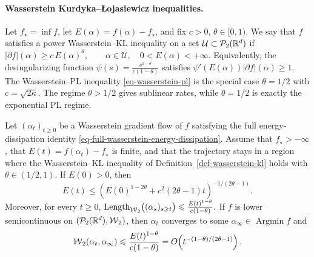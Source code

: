 \paragraph{Wasserstein Kurdyka--{\L}ojasiewicz inequalities.}
\begin{defn}\label{def-wasserstein-kl}
Let \(f_\star=\inf f\), let \(E(\alpha)=f(\alpha)-f_\star\), and fix \(c>0\), \(\theta\in[0,1)\). We say that \(f\) satisfies a power Wasserstein--KL inequality on a set \(\mathcal U\subset \mathcal{P}_2(\mathbb{R}^d)\) if
\(|\partial f|(\alpha) \geq c\,E(\alpha)^\theta, \qquad \alpha\in\mathcal U, \quad 0<E(\alpha)<+\infty.\)
Equivalently, the desingularizing function
\(\psi(s)=\frac{s^{1-\theta}}{c(1-\theta)}\)
satisfies \(\psi'(E(\alpha))|\partial f|(\alpha)\geq 1\). The Wasserstein--PL inequality \eqref{eq-wasserstein-pl} is the special case \(\theta=1/2\) with \(c=\sqrt{2\kappa}\). The regime \(\theta>1/2\) gives sublinear rates, while \(\theta=1/2\) is exactly the exponential PL regime.
\end{defn}
\begin{thm}\label{thm-wasserstein-kl-sublinear}
Let \((\alpha_t)_{t\geq0}\) be a Wasserstein gradient flow of \(f\) satisfying the full energy-dissipation identity \eqref{eq-full-wasserstein-energy-dissipation}. Assume that \(f_\star> -\infty\), that \(E(t)=f(\alpha_t)-f_\star\) is finite, and that the trajectory stays in a region where the Wasserstein--KL inequality of Definition~\ref{def-wasserstein-kl} holds with \(\theta\in(1/2,1)\). If \(E(0)>0\), then
\[
E(t)
\leq
\left(E(0)^{1-2\theta}+c^2(2\theta-1)t\right)^{-1/(2\theta-1)}.
\]
Moreover, for every \(t\geq0\), \(\operatorname{Length}_{\operatorname{\mathcal{W}}_2}\bigl((\alpha_s)_{s\geqslant t}\bigr) \leqslant \frac{E(t)^{1-\theta}}{c(1-\theta)}.\)
If \(f\) is lower semicontinuous on \((\mathcal{P}_2(\mathbb{R}^d),\operatorname{\mathcal{W}}_2)\), then \(\alpha_t\) converges to some \(\alpha_\infty\in\operatorname{Argmin}f\) and
\[
\operatorname{\mathcal{W}}_2(\alpha_t,\alpha_\infty)
\leqslant
\frac{E(t)^{1-\theta}}{c(1-\theta)}
=
O\!\left(t^{-(1-\theta)/(2\theta-1)}\right).
\]
\end{thm}
